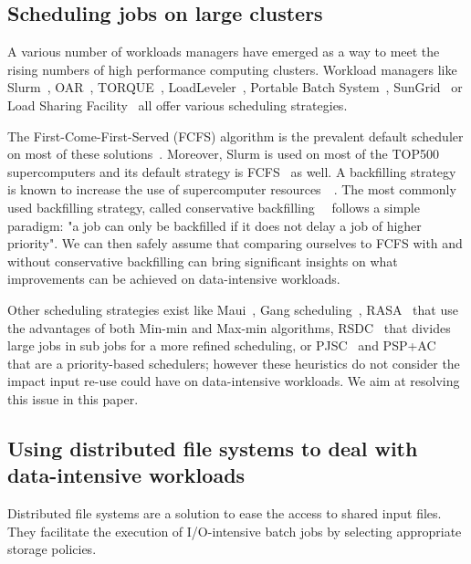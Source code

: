 \documentclass[sigconf,review,anonymous]{acmart}
\begin{document}
\subsection{Scheduling jobs on large clusters}

A various number of workloads managers have emerged 
as a way to meet the rising numbers of high performance computing clusters.
Workload managers like Slurm~\cite{SLURM}, OAR~\cite{oar},
TORQUE~\cite{torque}, LoadLeveler~\cite{loadleveler},
Portable Batch System~\cite{pbs}, SunGrid~\cite{sungrid}
or Load Sharing Facility~\cite{lsf} all offer
various scheduling strategies.

The First-Come-First-Served (FCFS) algorithm is the prevalent default
scheduler on most of these solutions~\cite{survey_workload_manager_and_scheduler}.
Moreover, Slurm is used on most of the TOP500 supercomputers and its default strategy is FCFS~\cite{slurm_website_scheduling} as well.
A backfilling strategy is known to increase
the use of supercomputer resources~\cite{maui}~\cite{New_Backfill}. 
The most commonly used backfilling strategy, called conservative 
backfilling~\cite{Characterization_of_Backfilling}~\cite{Introducing-New-Backfill-based} follows
a simple paradigm: "a job can only be backfilled if it does not
delay a job of higher priority".
We can then safely assume that comparing ourselves to FCFS with and without conservative backfilling can 
bring significant insights on what improvements can be achieved on data-intensive workloads.

Other scheduling strategies exist like 
Maui~\cite{Maui_Scheduler}, Gang scheduling~\cite{gang_scheduling}, 
RASA~\cite{rasa} that use the advantages of both Min-min and Max-min algorithms,
RSDC~\cite{rsdc} that divides large jobs in sub jobs for a more refined scheduling,
or PJSC~\cite{pjsc} and PSP+AC~\cite{PSP_AC} that are a priority-based schedulers; 
however these heuristics do not consider the impact
input re-use could have on data-intensive workloads.
We aim at resolving this issue in this paper.

\subsection{Using distributed file systems to deal with data-intensive workloads}

Distributed file systems are a solution to ease the access to 
shared input files. They facilitate the execution of I/O-intensive batch
jobs by selecting appropriate storage policies.
\end{document}
